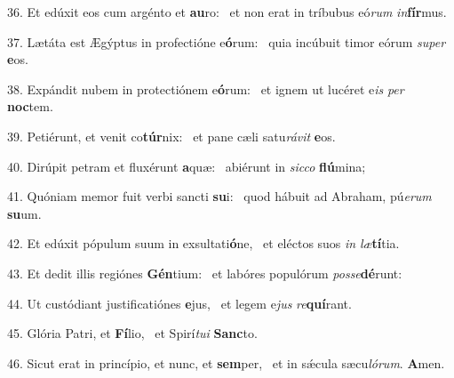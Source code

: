 36. Et edúxit eos cum argénto et \textbf{au}ro: \ast\  et non erat in tríbubus eó\textit{rum} \textit{in}\textbf{fír}mus.\

37. Lætáta est Ægýptus in profectióne e\textbf{ó}rum: \ast\  quia incúbuit timor eórum \textit{su}\textit{per} \textbf{e}os.\

38. Expándit nubem in protectiónem e\textbf{ó}rum: \ast\  et ignem ut lucéret e\textit{is} \textit{per} \textbf{noc}tem.\

39. Petiérunt, et venit co\textbf{túr}nix: \ast\  et pane cæli satu\textit{rá}\textit{vit} \textbf{e}os.\

40. Dirúpit petram et fluxérunt \textbf{a}quæ: \ast\  abiérunt in \textit{sic}\textit{co} \textbf{flú}mina;\

41. Quóniam memor fuit verbi sancti \textbf{su}i: \ast\  quod hábuit ad Abraham, pú\textit{e}\textit{rum} \textbf{su}um.\

42. Et edúxit pópulum suum in exsultati\textbf{ó}ne, \ast\  et eléctos suos \textit{in} \textit{læ}\textbf{tí}tia.\

43. Et dedit illis regiónes \textbf{Gén}tium: \ast\  et labóres populórum \textit{pos}\textit{se}\textbf{dé}runt:\

44. Ut custódiant justificatiónes \textbf{e}jus, \ast\  et legem e\textit{jus} \textit{re}\textbf{quí}rant.\

45. Glória Patri, et \textbf{Fí}lio, \ast\  et Spirí\textit{tu}\textit{i} \textbf{Sanc}to.\

46. Sicut erat in princípio, et nunc, et \textbf{sem}per, \ast\  et in sǽcula sæcu\textit{ló}\textit{rum}. \textbf{A}men.\

